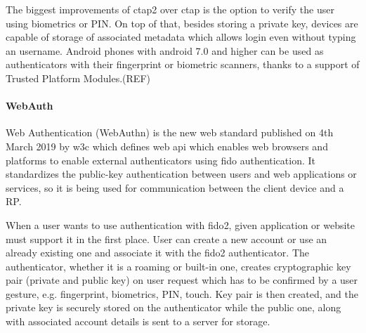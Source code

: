 The biggest improvements of \acrshort{ctap}2 over \acrshort{ctap} is the option to verify the user using biometrics or PIN. On top of that, besides storing a private key, devices are capable of storage of associated metadata which allows login even without typing an username. Android phones with android 7.0 and higher can be used as authenticators with their fingerprint or biometric scanners, thanks to a support of Trusted Platform Modules.(REF)

\paragraph{WebAuth} 
Web Authentication (WebAuthn) is the new web standard published on 4th March 2019  by \acrshort{w3c} which defines web \acrshort{api} which enables web browsers and platforms to enable external authenticators using \acrshort{fido} authentication. It standardizes the public-key authentication between users and web applications or services, so it is being used for communication between the client device and a RP.

When a user wants to use authentication with \acrshort{fido}2, given application or website must support it in the first place. User can create a new account or use an already existing one and associate it with the \acrshort{fido}2 authenticator. The authenticator, whether it is a roaming or built-in one, creates cryptographic key pair (private and public key) on user request which has to be confirmed by a user gesture, e.g. fingerprint, biometrics, PIN, touch. Key pair is then created, and the private key is securely stored on the authenticator while the public one, along with associated account details is sent to a server for storage.

